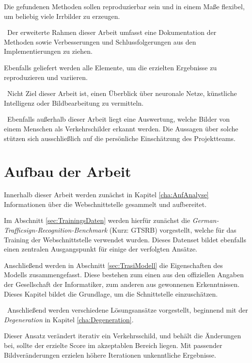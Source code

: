 Die gefundenen Methoden sollen reproduzierbar sein und in einem Maße flexibel, um beliebig viele Irrbilder zu erzeugen. 

~\newline Der erweiterte Rahmen dieser Arbeit umfasst eine Dokumentation der Methoden sowie Verbesserungen und Schlussfolgerungen aus den Implementierungen zu ziehen. 

Ebenfalls geliefert werden alle Elemente, um die erzielten Ergebnisse zu reproduzieren und variieren. 

~\newline Nicht Ziel dieser Arbeit ist, einen Überblick über neuronale Netze, künstliche Intelligenz oder Bildbearbeitung zu vermitteln. 

~\newline Ebenfalls außerhalb dieser Arbeit liegt eine Auswertung, welche Bilder von einem Menschen als Verkehrschilder erkannt werden. Die Aussagen über solche stützen sich ausschließlich auf die persönliche Einschätzung des Projektteams. 
\section{Aufbau der Arbeit}
Innerhalb dieser Arbeit werden zunächst in Kapitel \ref{cha:AnfAnalyse} Informationen über die Webschnittstelle gesammelt und aufbereitet. 

Im Abschnitt \ref{sec:TrainingsDaten} werden hierfür zunächst die \textit{German-Trafficsign-Recognition-Benchmark} (Kurz: GTSRB) vorgestellt, welche für das Training der Webschnittstelle verwendet wurden. Dieses Datenset bildet ebenfalls einen zentralen Ausgangspunkt für einige der verfolgten Ansätze.

Anschließend werden in Abschnitt \ref{sec:TrasiModell} die Eigenschaften des Modells zusammengefasst. 
Diese bestehen zum einen aus den offiziellen Angaben der Gesellschaft der Informatiker, zum anderen aus gewonnenen Erkenntnissen. Dieses Kapitel bildet die Grundlage, um die Schnittstelle einzuschätzen. 

~\newline Anschließend werden verschiedene Lösungsansätze vorgestellt, beginnend mit der \textit{Degeneration} in Kapitel \ref{cha:Degeneration}. 

Dieser Ansatz verändert iterativ ein Verkehrsschild, und behält die Änderungen bei, sollte der erzielte Score im akzeptablen Bereich liegen. Mit passender Bildveränderungen erzielen höhere Iterationen unkenntliche Ergebnisse. 

